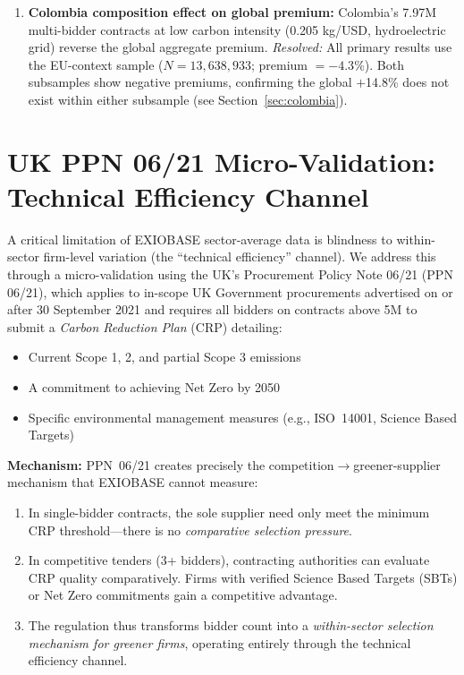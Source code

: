\documentclass[11pt]{article}
\begin{document}
\begin{enumerate}
\item \textbf{Colombia composition effect on global premium:} Colombia's 7.97M multi-bidder contracts at low carbon intensity (0.205 kg/USD, hydroelectric grid) reverse the global aggregate premium. \textit{Resolved:} All primary results use the EU-context sample ($N = 13{,}638{,}933$; premium $= -4.3\%$). Both subsamples show negative premiums, confirming the global $+$14.8\% does not exist within either subsample (see Section~\ref{sec:colombia}).
\end{enumerate}

\section{UK PPN 06/21 Micro-Validation: Technical Efficiency Channel}
\label{sec:ukppn}

A critical limitation of EXIOBASE sector-average data is blindness to within-sector firm-level variation (the ``technical efficiency'' channel). We address this through a micro-validation using the UK's Procurement Policy Note 06/21 (PPN 06/21), which applies to in-scope UK Government procurements advertised on or after 30 September 2021 and requires all bidders on contracts above \textsterling5M to submit a \textit{Carbon Reduction Plan} (CRP) detailing:

\begin{itemize}
    \item Current Scope 1, 2, and partial Scope 3 emissions
    \item A commitment to achieving Net Zero by 2050
    \item Specific environmental management measures (e.g., ISO~14001, Science Based Targets)
\end{itemize}

\textbf{Mechanism:} PPN~06/21 creates precisely the competition$\rightarrow$greener-supplier mechanism that EXIOBASE cannot measure:
\begin{enumerate}
    \item In single-bidder contracts, the sole supplier need only meet the minimum CRP threshold---there is no \textit{comparative selection pressure}.
    \item In competitive tenders (3+ bidders), contracting authorities can evaluate CRP quality comparatively. Firms with verified Science Based Targets (SBTs) or Net Zero commitments gain a competitive advantage.
    \item The regulation thus transforms bidder count into a \textit{within-sector selection mechanism for greener firms}, operating entirely through the technical efficiency channel.
\end{enumerate}
\end{document}
